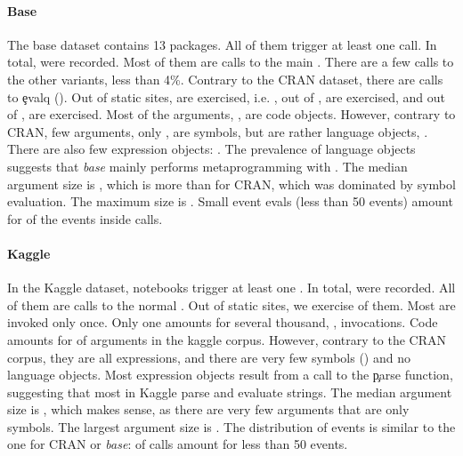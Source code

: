 \documentclass[screen,acmsmall]{acmart}
\begin{document}
\paragraph{Base} The base dataset contains 13 packages. All of them trigger at least one \eval call. In total, \baseAllcalls \eval  were recorded. Most of them are calls to the main \eval. There are a few calls to the other variants, less than 4\%. Contrary to the CRAN dataset, there are calls to \c{evalq} (\baseEvalqs). Out of \baseStaticeval \eval static sites, \baseTriggeredeval are exercised, i.e. \baseTriggeredevalpct, out of \baseStaticevalq, \baseTriggeredevalq are exercised, and out of \baseStaticevalparent, \baseTriggeredevalparent are exercised.  Most of the arguments, \baseCodepercent,  are code objects. However, contrary to CRAN, few arguments, only \baseSymbolpercent, are symbols, but are rather language objects, \baseLanguagepercent. There are also few expression objects: \baseExpressionpercent. The prevalence of language objects suggests that \emph{base} mainly performs metaprogramming with \eval.
The median argument size is \baseMedianszeval, which is more than for CRAN, which was dominated by symbol evaluation. The maximum size is \baseMaxszeval. Small event evals (less than 50 events) amount for \baseSmalleventspct of the events inside \eval calls.


\paragraph{Kaggle} In the Kaggle dataset, \kaggleNbruns notebooks trigger at least one \eval. In total, \kaggleAllcalls \eval were recorded. All of them are calls to the normal \eval.
Out of \kaggleStaticeval static \eval sites, we exercise \kaggleTriggeredeval of them. Most \eval are invoked only once. Only one \eval amounts for several thousand, \kaggleMaxcalls,  invocations. Code amounts for \kaggleCodepercent of arguments in the kaggle corpus. However, contrary to the CRAN corpus, they are all expressions, and there are very few symbols (\kaggleSymbolpercent) and no language objects. Most expression objects result from a call to the \c{parse} function, suggesting that most \eval in Kaggle parse and evaluate strings. The median argument size is \kaggleMedianszeval, which makes sense, as there are very few arguments that are only symbols. The largest argument size is \kaggleMaxszeval. The distribution of events is similar to the one for CRAN or \emph{base}: \kaggleSmalleventspct of \eval calls amount for less than 50 events.
\end{document}
